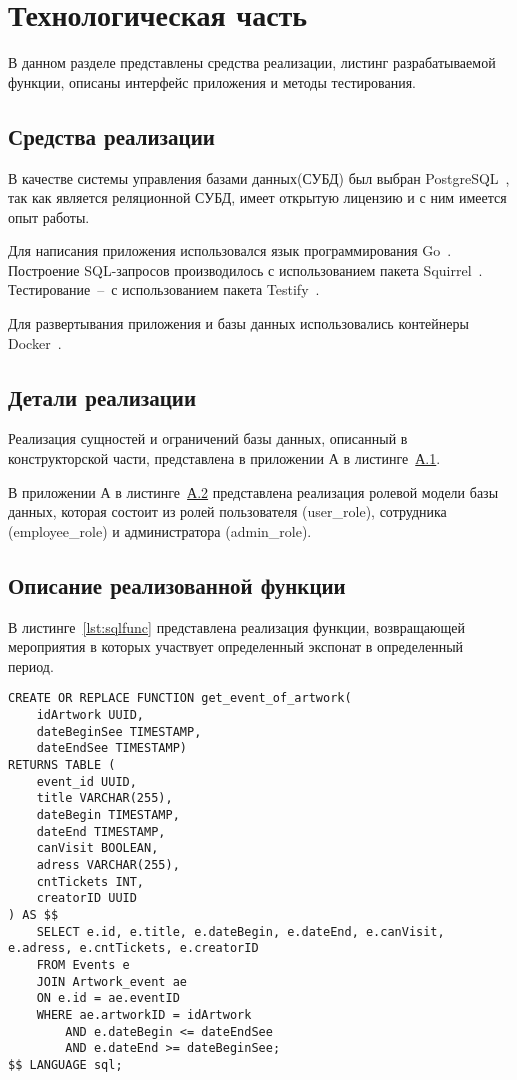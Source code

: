 \chapter{Технологическая часть}

В данном разделе представлены средства реализации, листинг разрабатываемой функции, описаны интерфейс приложения и методы тестирования.

\section{Средства реализации}

В качестве системы управления базами данных(СУБД) был выбран PostgreSQL~\cite{postgres}, так как является реляционной СУБД, имеет открытую лицензию и с ним имеется опыт работы.
 
Для написания приложения использовался язык программирования Go~\cite{golang}. Построение SQL-запросов производилось с использованием пакета Squirrel~\cite{squirrel}. Тестирование~--~с использованием пакета Testify~\cite{testify}.

Для развертывания приложения и базы данных использовались контейнеры Docker~\cite{docker}.



\section{Детали реализации}

Реализация сущностей и ограничений базы данных, описанный в конструкторской части, представлена в приложении А в листинге~\hyperref[lst:createdb]{А.1}.

В приложении А в листинге~\hyperref[lst:roles]{А.2} представлена реализация ролевой модели базы данных, которая состоит из ролей пользователя (user\_role), сотрудника (employee\_role) и администратора (admin\_role).

\section{Описание реализованной функции}

В листинге~\ref{lst:sqlfunc} представлена реализация функции, возвращающей мероприятия в которых участвует определенный экспонат в определенный период.

\begin{lstlisting}[style=sql, caption={Реализация функции}, label=lst:sqlfunc]
CREATE OR REPLACE FUNCTION get_event_of_artwork(
	idArtwork UUID, 
	dateBeginSee TIMESTAMP, 
	dateEndSee TIMESTAMP)
RETURNS TABLE (
	event_id UUID,
	title VARCHAR(255),
	dateBegin TIMESTAMP,
	dateEnd TIMESTAMP,
	canVisit BOOLEAN,
	adress VARCHAR(255),
	cntTickets INT,
	creatorID UUID
) AS $$
	SELECT e.id, e.title, e.dateBegin, e.dateEnd, e.canVisit, e.adress, e.cntTickets, e.creatorID
	FROM Events e
	JOIN Artwork_event ae 
	ON e.id = ae.eventID
	WHERE ae.artworkID = idArtwork
		AND e.dateBegin <= dateEndSee
		AND e.dateEnd >= dateBeginSee;
$$ LANGUAGE sql;
\end{lstlisting}


